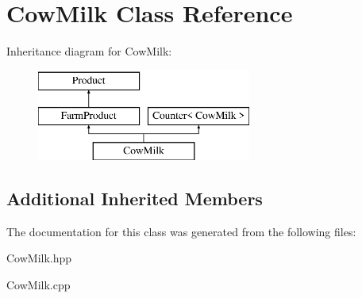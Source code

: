 \hypertarget{class_cow_milk}{}\section{Cow\+Milk Class Reference}
\label{class_cow_milk}
Inheritance diagram for Cow\+Milk\+:\begin{figure}[H]
\begin{center}
\leavevmode
\includegraphics[height=3.000000cm]{class_cow_milk}
\end{center}
\end{figure}
\subsection*{Additional Inherited Members}


The documentation for this class was generated from the following files\+:\begin{DoxyCompactItemize}
\item 
Cow\+Milk.\+hpp\item 
Cow\+Milk.\+cpp\end{DoxyCompactItemize}
